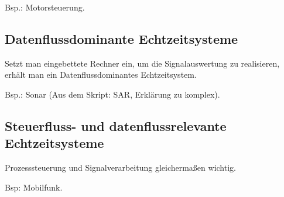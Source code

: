 Bsp.: Motorsteuerung.

\subsection{Datenflussdominante Echtzeitsysteme}
Setzt man eingebettete Rechner ein, um die Signalauswertung zu realisieren, erhält man ein
Datenflussdominantes Echtzeitsystem.

Bsp.: Sonar (Aus dem Skript: SAR, Erklärung zu komplex).

\subsection{Steuerfluss- und datenflussrelevante Echtzeitsysteme}
Prozesssteuerung und Signalverarbeitung gleichermaßen wichtig.

Bsp: Mobilfunk.

